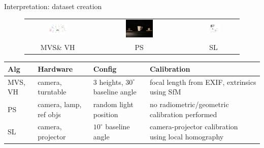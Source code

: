 \documentclass[10pt]{beamer}
\begin{document}
\begin{frame}{Interpretation: dataset creation}

\begin{figure}
\centering
\begin{tabular}{ccc}
\includegraphics[width=0.3\textwidth]{images/mvs_setup.PNG} &
\includegraphics[width=0.3\textwidth]{images/ps_setup.JPG} &
\includegraphics[width=0.3\textwidth]{images/sl_setup.png}\\
MVS\& VH & PS & SL \\
\end{tabular}
\end{figure}

\addtolength{\tabcolsep}{-3pt}
\begin{table}
  \begin{tabular}{p{0.8cm}p{2cm}p{3cm}p{4cm}}
  Alg & Hardware & Config & Calibration \\
  \midrule
  MVS, VH & camera, turntable  & 3 heights, $30^\circ$ baseline angle & focal length from EXIF, extrinsics using SfM \\
  PS & camera, lamp, ref objs & random light position & no radiometric/geometric calibration performed \\
  SL & camera, projector & $10^\circ$ baseline angle & camera-projector calibration using local homography\\
  \end{tabular}
\end{table}
\addtolength{\tabcolsep}{3pt}

\end{frame}
\end{document}
